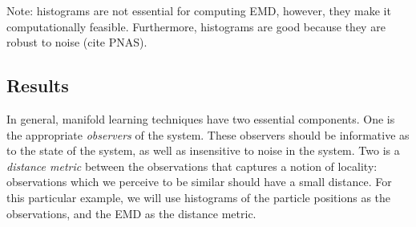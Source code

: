 \documentclass[preprint]{elsarticle}
\begin{document}
Note: histograms are not essential for computing EMD, however, they make it computationally feasible. Furthermore, histograms are good because they are robust to noise (cite PNAS). 





\subsection{Results}

In general, manifold learning techniques have two essential components.
%
One is the appropriate {\em observers} of the system. 
%
These observers should be informative as to the state of the system, as well as insensitive to noise in the system. 
%
Two is a {\em distance metric} between the observations that captures a notion of locality: observations which we perceive to be similar should have a small distance. 
%
For this particular example, we will use histograms of the particle positions as the observations, and the EMD as the distance metric.
\end{document}
